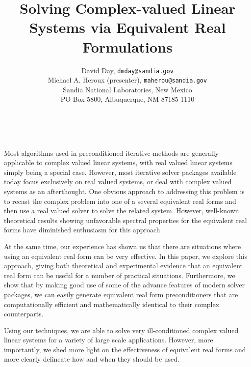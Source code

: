 \documentclass[11pt]{article}
\date{ ~ \hspace{-4mm}}
\title{Solving Complex-valued Linear Systems via Equivalent Real Formulations  }
\author{David Day, {\tt dmday@sandia.gov} \\ Michael A. Heroux (presenter), {\tt maherou@sandia.gov} \\ Sandia National Laboratories, New Mexico \\ PO Box 5800, Albuquerque, NM 87185-1110}
\begin{document}
\maketitle
\thispagestyle{empty}






Most algorithms used in preconditioned iterative methods are generally applicable to complex valued linear systems, with real valued linear systems simply being a special case. However, most iterative solver packages available today focus exclusively on real valued systems, or deal with complex valued systems as an afterthought. One obvious approach to addressing this problem is to recast the complex problem into one of a several equivalent real forms and then use a real valued solver to solve the related system. However, well-known theoretical results showing unfavorable spectral properties for the equivalent real forms have diminished enthusiasm for this approach. 





At the same time, our experience has shown us that there are situations where using an equivalent real form can be very effective. In this paper, we explore this approach, giving both theoretical and experimental evidence that an equivalent real form can be useful for a number of practical situations. Furthermore, we show that by making good use of some of the advance features of modern solver packages, we can easily generate equivalent real form preconditioners that are computationally efficient and mathematically identical to their complex counterparts.





Using our techniques, we are able to solve very ill-conditioned complex valued linear systems for a variety of large scale applications. However, more importantly, we shed more light on the effectiveness of equivalent real forms and more clearly delineate how and when they should be used.
\end{document}
